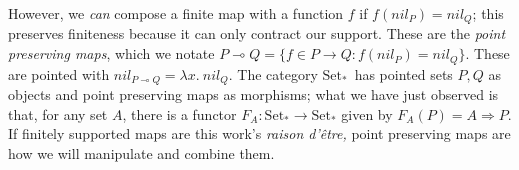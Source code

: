 \documentclass[runningheads]{llncs}
\newcommand\strong[1]{{\bfseries#1}}
\newcommand\todo[1]{{\color{IndianRed}#1}}
\newcommand\xxx{\text{\todo{\strong{XXX}}}}
\renewcommand\todo[1]{\ignorespaces}\renewcommand\xxx{\text{\color{IndianRed}\strong{XXX}}}
\newcommand\catname[1]{\ensuremath{\mathrm{#1}}}
\newcommand\Point{\ensuremath{\catname{Set}_{*}}}
\newcommand\name[1]{\ensuremath{\mathit{#1}}}
\newcommand\<\:                 %
\newcommand\fnspace{\<}         %
\newcommand\fn[1]{\lambda{#1}.\fnspace}
\newcommand\lto\multimap        %
\newcommand\fto\Rightarrow
\newcommand\typename\textit
\newcommand\maybe{\typename{maybe}}
\newcommand\nil{\name{nil}}
\newcommand\pwild{\text{\textunderscore}}
\newcommand\nat{\mathbb{N}}
\newcommand\natz{\ensuremath{\nat_0}}
\begin{document}
However, we \emph{can} compose a finite map with a function $f$ if $f(\nil_P) = \nil_Q$; this preserves finiteness because it can only contract our support.
%
These are the \emph{point preserving maps}, which we notate $P \lto Q = \{ f \in P \to Q : f(\nil_P) = \nil_Q \}$.
These are pointed with $\nil_{P \lto Q} = \fn{x} \nil_Q$.
The category \Point\ has pointed sets $P,Q$ as objects and point preserving maps as morphisms; what we have just observed is that, for any set $A$, there is a functor $F_A : \Point \to \Point$ given by $F_A(P) = A \fto P$.
If finitely supported maps are this work's \emph{raison d'\^etre,} point preserving maps are how we will manipulate and combine them.








\end{document}
